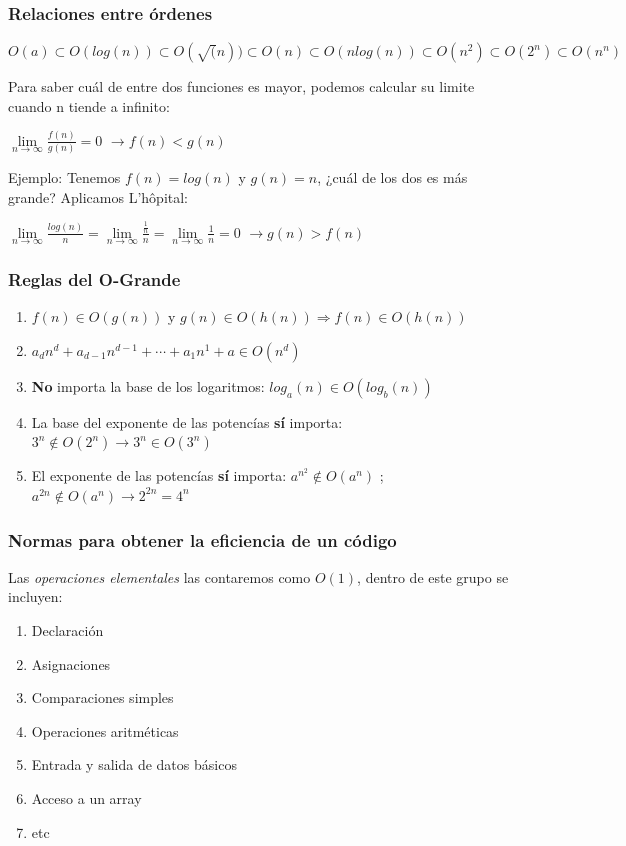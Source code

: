 \documentclass[10pt,a4paper,spanish]{report}
\begin{document}
\subsubsection{\textcolor[rgb]{0.1,0.2,0.6}Relaciones entre órdenes}
\noindent
$O(a)\subset O(log(n))\subset O(\sqrt(n))\subset O(n)\subset O(nlog(n))\subset O(n^{2})\subset O(2^{n})\subset O(n^{n})$

\noindent
Para saber cuál de entre dos funciones es mayor, podemos calcular su limite cuando n tiende a infinito:
\begin{center}
$\lim\limits_{n\rightarrow \infty}\frac{f(n)}{g(n)}=0$ $\longrightarrow f(n) < g(n)$
\end{center}

\noindent
Ejemplo: Tenemos $f(n) = log(n)$ y $g(n) = n$, ¿cuál de los dos es más grande? Aplicamos L'hôpital:

$\lim\limits_{n\rightarrow \infty}\frac{log(n)}{n}=\lim\limits_{n\rightarrow \infty}\frac{\frac{1}{n}}{n}=\lim\limits_{n\rightarrow \infty}\frac{1}{n}=0$ $\longrightarrow g(n) > f(n)$

\subsubsection{\textcolor[rgb]{0.1,0.2,0.6}Reglas del O-Grande}
\begin{enumerate}[1.]
\item $f(n) \in O(g(n))$ y $g(n) \in O(h(n)) \Longrightarrow f(n) \in O(h(n))$
\item $a_{d}n^{d} + a_{d-1}n^{d-1} + \cdots + a_{1}n^{1} + a \in O(n^{d})$
\item \textbf{No} importa la base de los logaritmos: $log_{a}(n) \in O(log_{b}(n))$
\item La base del exponente de las potencías \textbf{sí} importa: $3^{n} \notin O(2^{n}) \longrightarrow 3^{n} \in O(3^{n})$
\item El exponente de las potencías \textbf{sí} importa: $a^{n^{2}} \notin O(a^{n})$ ; $a^{2n} \notin O(a^{n}) \rightarrow 2^{2n} = 4^{n}$
\end{enumerate}

\subsubsection{\textcolor[rgb]{0.1,0.2,0.6}Normas para obtener la eficiencia de un código}
\noindent
Las \textit{\textcolor[rgb]{0.1,0.2,0.6}{operaciones elementales}} las contaremos como $O(1)$, dentro de este grupo se incluyen:
\begin{enumerate}[$\heartsuit$]
\item Declaración
\item Asignaciones
\item Comparaciones simples
\item Operaciones aritméticas
\item Entrada y salida de datos básicos
\item Acceso a un array
\item etc
\end{enumerate}
\end{document}
